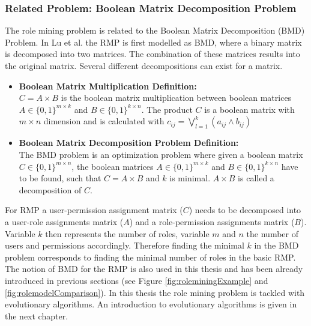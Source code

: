     \subsubsection{Related Problem: Boolean Matrix Decomposition Problem}
    The role mining problem is related to the Boolean Matrix Decomposition (BMD) Problem. In Lu et al.\cite{4497438} the RMP is first modelled as BMD, where a binary matrix is decomposed into two matrices. The combination of these matrices results into the original matrix. Several different decompositions can exist for a matrix.
    \begin{itemize}
    \item \textbf{Boolean Matrix Multiplication Definition:}\\
    $C = A \times B$ is the boolean matrix multiplication between boolean matrices $A \in \{0,1\}^{m \times k}$ and $B \in \{0,1\}^{k \times n}$. The product $C$ is a boolean matrix with $m \times n$ dimension and is calculated with $c_{ij} = \bigvee_{l=1}^{k}(a_{ij} \wedge b_{ij})$
     \item \textbf{Boolean Matrix Decomposition Problem Definition:}\\
    The BMD problem is an optimization problem where given a boolean matrix $C \in \{0,1\}^{m \times n}$, the boolean matrices $A \in \{0,1\}^{m \times k}$ and $B \in \{0,1\}^{k \times n}$ have to be found, such that $C = A \times B$ and $k$ is minimal\cite{vaidya2012boolean}. $A \times B$ is called a decomposition of $C$.
    \end{itemize}
    For RMP a user-permission assignment matrix ($C$) needs to be decomposed into a user-role assignments matrix ($A$) and a role-permission assignments matrix ($B$). Variable $k$ then represents the number of roles, variable $m$ and $n$ the number of users and permissions accordingly. Therefore finding the minimal $k$ in the BMD problem corresponds to finding the minimal number of roles in the basic RMP. The notion of BMD for the RMP is also used in this thesis and has been already introduced in previous sections (see Figure \ref{fig:roleminingExample} and \ref{fig:rolemodelComparison}).
\newline
\newline
In this thesis the role mining problem is tackled with evolutionary algorithms. An introduction to evolutionary algorithms is given in the next chapter.